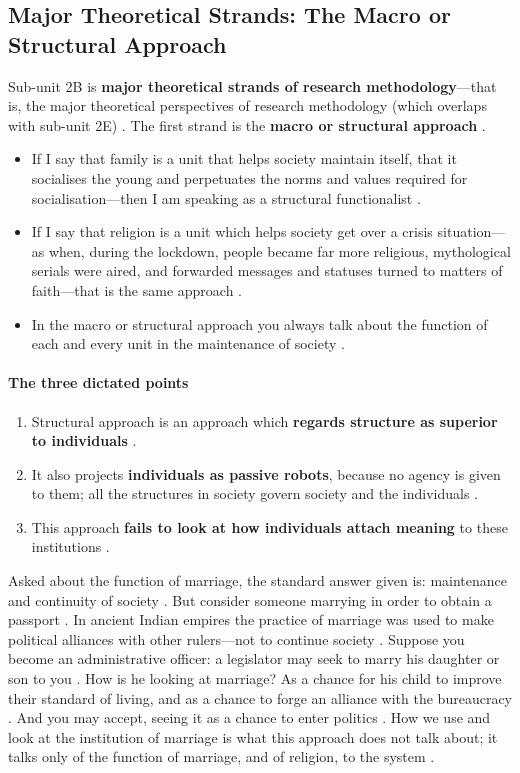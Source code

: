 \subsection{Major Theoretical Strands: The Macro or Structural Approach}
Sub-unit 2B is \textbf{major theoretical strands of research methodology}---that is, the major theoretical perspectives of research methodology (which overlaps with sub-unit 2E) . The first strand is the \textbf{macro or structural approach} .
\begin{itemize}
    \item If I say that family is a unit that helps society maintain itself, that it socialises the young and perpetuates the norms and values required for socialisation---then I am speaking as a structural functionalist .
    \item If I say that religion is a unit which helps society get over a crisis situation---as when, during the lockdown, people became far more religious, mythological serials were aired, and forwarded messages and statuses turned to matters of faith---that is the same approach .
    \item In the macro or structural approach you always talk about the function of each and every unit in the maintenance of society .
\end{itemize}

\paragraph{The three dictated points}
\begin{enumerate}
    \item Structural approach is an approach which \textbf{regards structure as superior to individuals} .
    \item It also projects \textbf{individuals as passive robots}, because no agency is given to them; all the structures in society govern society and the individuals .
    \item This approach \textbf{fails to look at how individuals attach meaning} to these institutions .
\end{enumerate}

\begin{ExampleBox}
Asked about the function of marriage, the standard answer given is: maintenance and continuity of society . But consider someone marrying in order to obtain a passport . In ancient Indian empires the practice of marriage was used to make political alliances with other rulers---not to continue society . Suppose you become an administrative officer: a legislator may seek to marry his daughter or son to you . How is he looking at marriage? As a chance for his child to improve their standard of living, and as a chance to forge an alliance with the bureaucracy . And you may accept, seeing it as a chance to enter politics . How we use and look at the institution of marriage is what this approach does not talk about; it talks only of the function of marriage, and of religion, to the system .
\end{ExampleBox}

